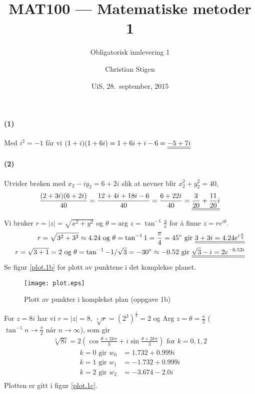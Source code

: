 \documentclass[a4paper,norsk,12pt]{article}
\title{MAT100 --- Matematiske metoder 1}
\subtitle{Obligatorisk innlevering 1}
\author{Christian Stigen}
\date{UiS, 28.~september, 2015}
\begin{document}
\maketitle


\paragraph{(1)}
Med $i^2 = -1$ får vi
\begin{math}
  (1+i)(1+6i) = 1+6i+i-6 = {\underline{\underline{-5+7i}}}
\end{math}

\paragraph{(2)}
Utvider brøken med $x_2 - iy_2 = 6 + 2i$ slik at nevner blir $x_2^2 +
y_2^2 = 40$,
\begin{equation*}
  \frac{(2+3i)(6+2i)}{40} = \frac{12+4i+18i-6}{40}
  = \frac{6+22i}{40} = {\underline{\underline{\frac{3}{20} + \frac{11}{20}i}}}
\end{equation*}


Vi bruker $r = |z| = \sqrt{x^2+y^2}$ og $\theta = \text{arg } z =
\tan^{-1}\frac{y}{x}$ for å finne $z = re^{i\theta}$.
\begin{equation*}
\begin{split}
  r = \sqrt{3^2+3^2} \approx 4.24 \text{ og } \theta = \tan^{-1}{1} =
  \frac{\pi}{4} = 45^\circ \text{ gir } {\underline{\underline{3+3i = 4.24 e^{i\frac{\pi}{4}}}}}
  \\
  r=\sqrt{3+1}=2 \text{ og } \theta = \tan^{-1}{-1/\sqrt{3}} = -30^\circ \approx -0.52
  \text{ gir }
  {\underline{\underline{\sqrt{3}-i = 2e^{-0.52i}}}}
\end{split}
\end{equation*}
Se figur \vref{plot.1b} for plott av punktene i det komplekse planet.

\begin{figure}
\centering
\texttt{[image: plot.eps]}
\caption{Plott av punkter i komplekst plan (oppgave 1b)}
\label{plot.1b}
\end{figure}

For $z=8i$ har vi $r = |z| = 8$, $\sqrt[3]{r} = (2^3)^\frac{1}{3} = 2$ og
$\text{Arg }z = \theta = \frac{\pi}{2}$ ($\tan^{-1}{n} \to \frac{\pi}{2} \text{ når } n \to
\infty$), som gir
\begin{equation*}
\begin{split}
  \sqrt[3]{8i} = 2\left( \cos{\frac{\theta+2k\pi}{3}} +
  i\sin{\frac{\theta+2k\pi}{3}} \right) \text{ for } k = 0, 1, 2
\end{split}
\end{equation*}
%
\begin{equation*}
\begin{split}
  k = 0 \text{ gir } w_0 & = 1.732 + 0.999i \\
  k = 1 \text{ gir } w_1 & = -1.732 + 0.999i \\
  k = 2 \text{ gir } w_2 & = -3.674 - 2.0i \\
\end{split}
\end{equation*}
Plotten er gitt i figur \vref{plot.1c}.
\end{document}
